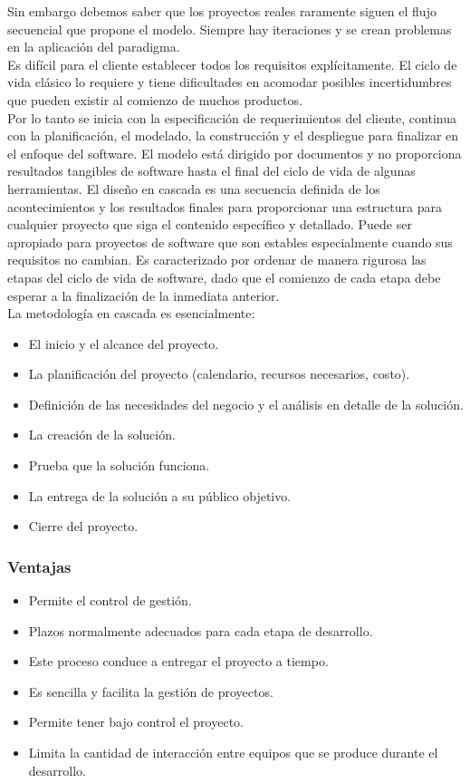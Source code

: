 	Sin embargo debemos saber que los proyectos reales raramente siguen el flujo secuencial que propone el modelo. Siempre hay iteraciones y se crean problemas en la aplicaci\'on del paradigma.\\

	Es dif\'icil para el cliente establecer todos los requisitos expl\'icitamente. El ciclo de vida cl\'asico lo requiere y tiene dificultades en acomodar posibles incertidumbres que pueden existir al comienzo de muchos productos. \\

	Por lo tanto se inicia con la especificaci\'on de requerimientos del cliente, continua con la planificaci\'on, el modelado, la construcci\'on y el despliegue para finalizar en el enfoque del software. El modelo está dirigido por documentos y no proporciona resultados tangibles de software hasta el final del ciclo de vida de algunas herramientas. El dise\~no en cascada es una secuencia definida de los acontecimientos y los resultados finales para proporcionar una estructura para cualquier proyecto que siga el contenido espec\'ifico y detallado. Puede ser apropiado para proyectos de software que son estables especialmente cuando sus requisitos no cambian. Es caracterizado por ordenar de manera rigurosa las etapas del ciclo de vida de software, dado que el comienzo de cada etapa debe esperar a la finalizaci\'on de la inmediata anterior.\\

	La metodolog\'ia en cascada es esencialmente:
	\begin{itemize}
		\item El inicio y el alcance del proyecto.
		\item La planificaci\'on del proyecto (calendario, recursos necesarios, costo).
		\item Definici\'on de las necesidades del negocio y el an\'alisis en detalle de la soluci\'on.
		\item La creaci\'on de la soluci\'on.
		\item Prueba que la soluci\'on funciona.
		\item La entrega de la soluci\'on a su p\'ublico objetivo.
		\item Cierre del proyecto.
	\end{itemize}

	\subsubsection{Ventajas}
	\begin{itemize}
		\item Permite el control de gesti\'on.
		\item Plazos normalmente adecuados para cada etapa de desarrollo.
		\item Este proceso conduce a entregar el proyecto a tiempo.
		\item Es sencilla y facilita la gesti\'on de proyectos.
		\item Permite tener bajo control el proyecto.
		\item Limita la cantidad de interacci\'on entre equipos que se produce durante el desarrollo.
	\end{itemize}


